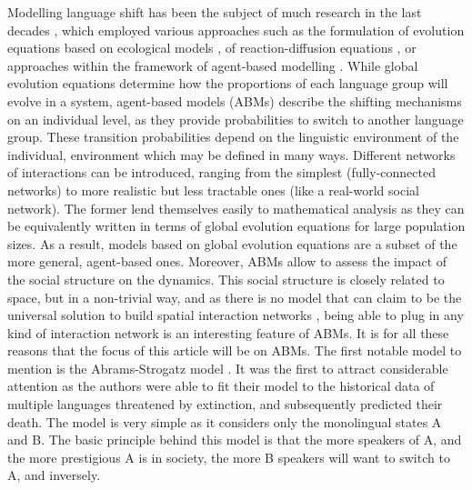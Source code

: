 \documentclass[../thesis.tex]{subfiles}
\begin{document}
Modelling language shift has been the subject of much research in the last decades
\cite{CastellanoStatisticalPhysics2009,BoissonneaultSystematicInterdisciplinary2021},
which employed various approaches such as the formulation of evolution equations based
on ecological models
\cite{MiraInterlinguisticSimilarity2005,PinascoCoexistenceLanguages2006,KandlerEcologicalModels2008,SoleDiversityCompetition2010,HeinsaluRoleBilinguals2014},
of reaction-diffusion equations
\cite{KandlerDemographyLanguage2009,PatriarcaInfluenceGeography2009,IsernLanguageExtinction2014,ProchazkaQuantifyingDriving2017},
or approaches within the framework of agent-based modelling
\cite{CastelloOrderingDynamics2006,MinettModellingEndangered2008,CaridiSchellingvoterModel2013,ProchazkaQuantifyingDriving2017}.
While global evolution equations determine how the proportions of each language group
will evolve in a system, agent-based models (ABMs) describe the shifting mechanisms on
an individual level, as they provide probabilities to switch to another language group.
These transition probabilities depend on the linguistic environment of the individual,
environment which may be defined in many ways. Different networks of interactions can be
introduced, ranging from the simplest (fully-connected networks) to more realistic but
less tractable ones (like a real-world social network). The former lend themselves
easily to mathematical analysis as they can be equivalently written in terms of global
evolution equations for large population sizes. As a result, models based on global
evolution equations are a subset of the more general, agent-based ones. Moreover, ABMs
allow to assess the impact of the social structure on the dynamics. This social
structure is closely related to space, but in a non-trivial way, and as there is no
model that can claim to be the universal solution to build spatial interaction networks
\cite{BarbosaHumanMobility2018}, being able to plug in any kind of interaction network
is an interesting feature of ABMs. It is for all these reasons that the focus of this
article will be on ABMs. The first notable model to mention is the Abrams-Strogatz model
\cite{AbramsModellingDynamics2003}. It was the first to attract considerable attention
as the authors were able to fit their model to the historical data of multiple languages
threatened by extinction, and subsequently predicted their death. The model is very
simple as it considers only the monolingual states A and B. The basic principle behind
this model is that the more speakers of A, and the more prestigious A is in society, the
more B speakers will want to switch to A, and inversely.
\end{document}
